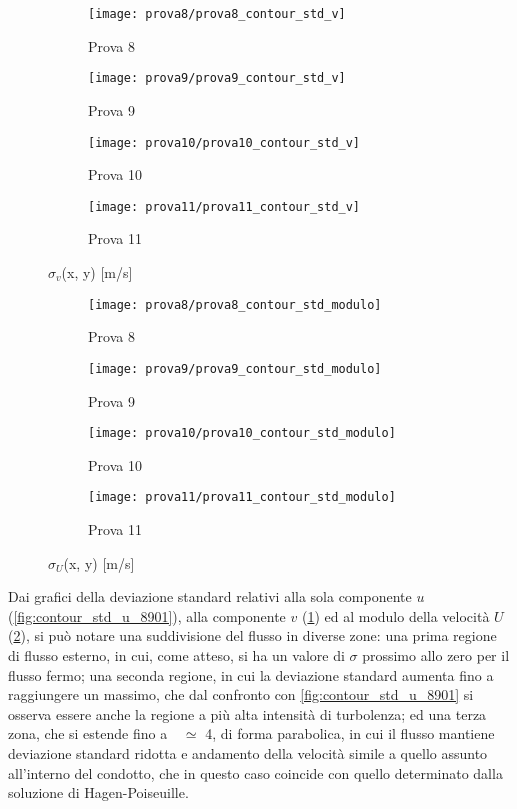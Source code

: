 \documentclass{article} %
\newcommand{\xd}{\nicefrac{\textrm{x}}{\textrm{D}}\ }
\begin{document}
\begin{figure}[h!]
	\centering
	\begin{subfigure}[b]{0.24\textwidth}
		\texttt{[image: prova8/prova8\_contour\_std\_v]}
		\caption{Prova 8}
	\end{subfigure}
	\begin{subfigure}[b]{0.24\textwidth}
		\texttt{[image: prova9/prova9\_contour\_std\_v]}
		\caption{Prova 9}
	\end{subfigure}
	\begin{subfigure}[b]{0.24\textwidth}
		\texttt{[image: prova10/prova10\_contour\_std\_v]}
		\caption{Prova 10}
	\end{subfigure}
	\begin{subfigure}[b]{0.24\textwidth}
		\texttt{[image: prova11/prova11\_contour\_std\_v]}
		\caption{Prova 11}
	\end{subfigure}
	\caption{$\sigma_v$(x, y) [m/s]}
	\label{fig:contour_std_v_8901}
\end{figure}
\begin{figure}[h!]
	\centering
	\begin{subfigure}[b]{0.24\textwidth}
		\texttt{[image: prova8/prova8\_contour\_std\_modulo]}
		\caption{Prova 8}
	\end{subfigure}
	\begin{subfigure}[b]{0.24\textwidth}
		\texttt{[image: prova9/prova9\_contour\_std\_modulo]}
		\caption{Prova 9}
	\end{subfigure}
	\begin{subfigure}[b]{0.24\textwidth}
		\texttt{[image: prova10/prova10\_contour\_std\_modulo]}
		\caption{Prova 10}
	\end{subfigure}
	\begin{subfigure}[b]{0.24\textwidth}
		\texttt{[image: prova11/prova11\_contour\_std\_modulo]}
		\caption{Prova 11}
	\end{subfigure}
	\caption{$\sigma_U$(x, y) [m/s]}
	\label{fig:contour_std_umod_8901}
\end{figure}
Dai grafici della deviazione standard relativi alla sola componente $u$ (\cref{fig:contour_std_u_8901}), alla componente $v$ (\cref{fig:contour_std_v_8901}) ed al modulo della velocità $U$ (\cref{fig:contour_std_umod_8901}), si può notare una suddivisione del flusso in diverse zone: una prima regione di flusso esterno, in cui, come atteso, si ha un valore di $\sigma$ prossimo allo zero per il flusso fermo; una seconda regione, in cui la deviazione standard aumenta fino a raggiungere un massimo, che dal confronto con \cref{fig:contour_std_u_8901} si osserva essere anche la regione a più alta intensità di turbolenza; ed una terza zona, che si estende fino a \xd $\ \simeq$ 4, di forma parabolica, in cui il flusso mantiene deviazione standard ridotta e andamento della velocità simile a quello assunto all'interno del condotto, che in questo caso coincide con quello determinato dalla soluzione di Hagen-Poiseuille.
\end{document}
